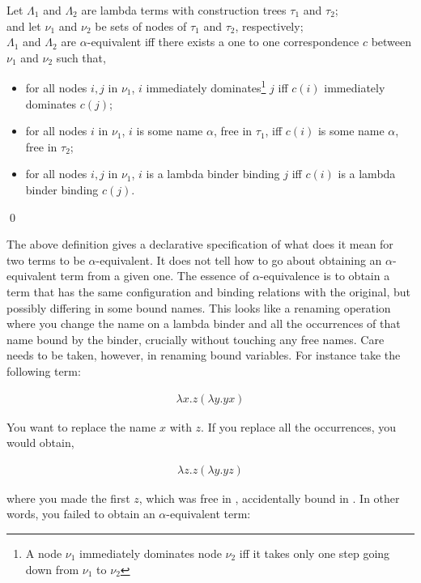 \documentclass[11pt]{article}
\begin{document}
\begin{udefinition}
Let $\Lambda_1$ and $\Lambda_2$ are lambda terms with construction trees $\tau_1$ and $\tau_2$;\\
and let $\nu_1$ and $\nu_2$ be sets of nodes of $\tau_1$ and $\tau_2$, respectively;\\
$\Lambda_1$ and $\Lambda_2$ are $\alpha$-equivalent iff
there exists a one to one correspondence $c$ between $\nu_1$ and $\nu_2$ such that,
\begin{itemize}
\item for all nodes $i,j$ in $\nu_1$, $i$ immediately dominates\footnote{A node $\nu_1$ immediately dominates node $\nu_2$ iff it takes only one step going down from $\nu_1$ to $\nu_2$} $j$ iff $c(i)$ immediately dominates $c(j)$; 
\item for all nodes $i$ in $\nu_1$, $i$ is some name $\alpha$, free in $\tau_1$, iff $c(i)$ is some name $\alpha$, free in $\tau_2$;
\item for all nodes $i,j$ in $\nu_1$, $i$ is a lambda binder binding $j$ iff $c(i)$ is a lambda binder binding $c(j)$.
\end{itemize}
\qed
\end{udefinition}


The above definition gives a declarative specification of what does it mean for two terms to be $\alpha$-equivalent. It does not tell how to go about obtaining an $\alpha$-equivalent term from a given one. The essence of $\alpha$-equivalence is to obtain a term that has the same configuration and binding relations with the original, but possibly differing in some bound names. This looks like a renaming operation where you change the name on a lambda binder and all the occurrences of that name bound by the binder, crucially without touching any free names. Care needs to be taken, however, in renaming bound variables. For instance take the following term:

\begin{align}\label{alphaorg}
\lambda x.z(\lambda y.yx)
\end{align}

You want to replace the name $x$ with $z$. If you replace all the occurrences, you would obtain,

\begin{align}\label{alphawrong}
\lambda z.z(\lambda y.yz)
\end{align}

where you made the first $z$, which was free in , accidentally bound in . In other words, you failed to obtain an $\alpha$-equivalent term:
\end{document}
